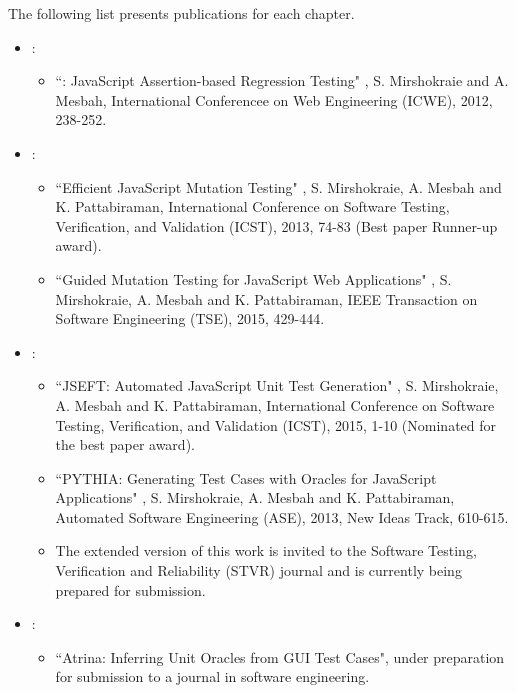 The following list presents publications for each chapter.
\begin{itemize}
\item {}:
\begin{itemize}
\item ``\jsart: JavaScript Assertion-based Regression Testing" \cite{mirshokraie:icwe12},
S. Mirshokraie and A. Mesbah, International Conferencee on Web Engineering (ICWE), 2012, 238-252.
\end{itemize}
\item {}:
\begin{itemize}
\item ``Efficient JavaScript Mutation Testing" \cite{mirshokraie:icst13},
S. Mirshokraie, A. Mesbah and K. Pattabiraman, International Conference on Software Testing, Verification, and Validation (ICST), 2013, 74-83 (Best paper Runner-up award).
\item ``Guided Mutation Testing for JavaScript Web Applications" \cite{mirshokraie:tse15},
S. Mirshokraie, A. Mesbah and K. Pattabiraman, IEEE Transaction on Software Engineering (TSE), 2015, 429-444.
\end{itemize}
\item {}:
\begin{itemize}
\item ``JSEFT: Automated JavaScript Unit Test Generation" \cite{mirshokraie:icst15},
S. Mirshokraie, A. Mesbah and K. Pattabiraman, International Conference on Software Testing, Verification, and Validation (ICST), 2015, 1-10 (Nominated for the best paper award).
\item ``PY\-THIA: Generating Test Cases with Oracles
for JavaScript Applications" \cite{shabnam:ase13},
S. Mirshokraie, A. Mesbah and K. Pattabiraman, Automated Software Engineering (ASE), 2013, New Ideas Track, 610-615.
\item The extended version of this work is invited to the Software Testing, Verification and Reliability (STVR) journal and is currently being prepared for submission. 
\end{itemize} 
\item {}:
\begin{itemize}
\item ``Atrina: Inferring Unit Oracles from GUI Test Cases", under preparation for submission to a journal in software engineering.
\end{itemize}
\end{itemize}

